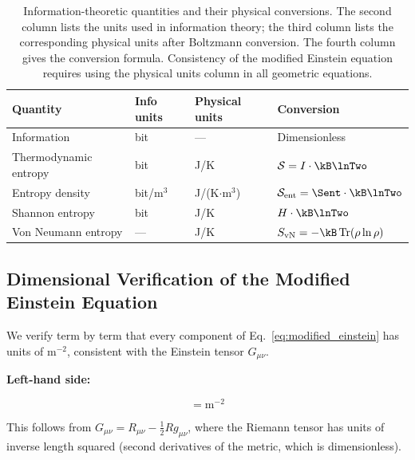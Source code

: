 \begin{table}[H]
    \centering
    \caption{Information-theoretic quantities and their physical conversions.
    The second column lists the units used in information theory;
    the third column lists the corresponding physical units after
    Boltzmann conversion. The fourth column gives the conversion formula.
    Consistency of the modified Einstein equation requires using the
    physical units column in all geometric equations.}
    \label{tab:unit_conversion}
    \begin{tabular}{llll}
        \toprule
        \textbf{Quantity} & \textbf{Info units} & \textbf{Physical units}
        & \textbf{Conversion} \\
        \midrule
        Information & bit & --- & Dimensionless \\
        Thermodynamic entropy & bit & J/K
        & $\mathcal{S} = I\cdot\kB\lnTwo$ \\
        Entropy density & bit/m$^3$ & J/(K$\cdot$m$^3$)
        & $\mathcal{S}_{\mathrm{ent}} = \Sent\cdot\kB\lnTwo$ \\
        Shannon entropy & bit & J/K
        & $H\cdot\kB\lnTwo$ \\
        Von Neumann entropy & --- & J/K
        & $S_{\mathrm{vN}} = -\kB\,\mathrm{Tr}(\rho\ln\rho)$ \\
        \bottomrule
    \end{tabular}
\end{table}

\subsection{Dimensional Verification of the Modified Einstein Equation}
\label{subsec:dimensional_verification}

We verify term by term that every component of
Eq.~\eqref{eq:modified_einstein} has units of m$^{-2}$,
consistent with the Einstein tensor $G_{\mu\nu}$.

\vspace{0.5em}
\noindent\textbf{Left-hand side:}

\begin{equation}
    [G_{\mu\nu}] = \mathrm{m}^{-2}
    \label{eq:dim_lhs}
\end{equation}

This follows from $G_{\mu\nu} = R_{\mu\nu} - \frac{1}{2}Rg_{\mu\nu}$,
where the Riemann tensor has units of inverse length squared (second
derivatives of the metric, which is dimensionless).

